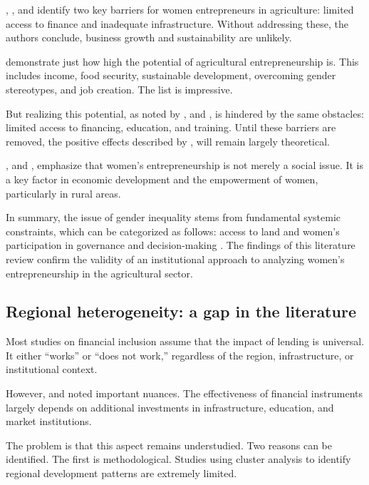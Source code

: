 ﻿\documentclass[pdflatex,sn-mathphys-ay]{sn-jnl}
\begin{document}
\citet{ref35}, \citet{ref23}, and \citet{ref62} identify two key barriers for women entrepreneurs in
agriculture: limited access to finance and inadequate infrastructure.
Without addressing these, the authors conclude, business growth and
sustainability are unlikely.

\citet{ref99} demonstrate just how high the potential of
agricultural entrepreneurship is. This includes income, food security,
sustainable development, overcoming gender stereotypes, and job
creation. The list is impressive.

But realizing this potential, as noted by \citet{ref25},
and \citet{ref85}, is hindered by the same obstacles:
limited access to financing, education, and training. Until these
barriers are removed, the positive effects described by \citet{ref99}, will remain largely theoretical.

\citet{ref89}, and \citet{ref19},
emphasize that women's entrepreneurship is not merely a social issue. It
is a key factor in economic development and the empowerment of women,
particularly in rural areas.

In summary, the issue of gender inequality stems
from fundamental systemic constraints, which can be categorized as
follows: access to land \citep{ref39,ref06,ref102,ref52,ref12} and women's participation in governance and decision-making
\citep{ref79,ref40,ref08,ref09,ref69}. The findings of this literature review
confirm the validity of an institutional approach to analyzing women's
entrepreneurship in the agricultural sector.

\subsection{Regional heterogeneity: a gap in the literature}

Most studies on financial inclusion assume that the impact of lending is
universal. It either ``works'' or ``does not work,'' regardless of the
region, infrastructure, or institutional context.

However, \citet{ref21} and \citet{ref17}
noted important nuances. The effectiveness of financial
instruments largely depends on additional investments in infrastructure,
education, and market institutions.

The problem is that this aspect remains understudied. Two reasons can be
identified. The first is methodological. Studies using cluster analysis
to identify regional development patterns are extremely limited.
\end{document}
